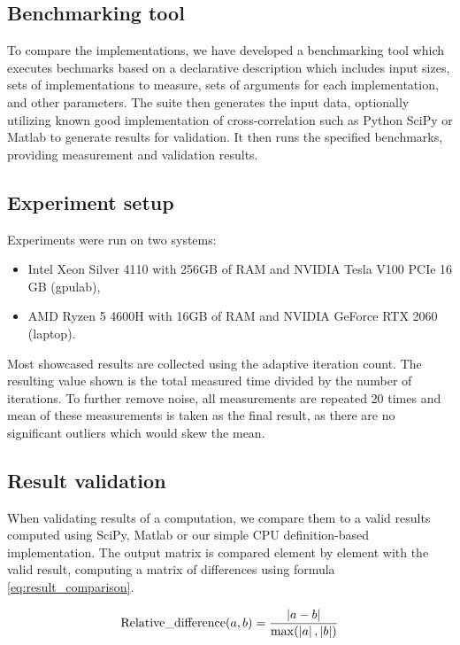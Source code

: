\subsection{Benchmarking tool}

To compare the implementations, we have developed a benchmarking tool which executes bechmarks based on a declarative description which includes input sizes, sets of implementations to measure, sets of arguments for each implementation, and other parameters. The suite then generates the input data, optionally utilizing known good implementation of cross-correlation such as Python SciPy or Matlab to generate results for validation. It then runs the specified benchmarks, providing measurement and validation results.

\subsection{Experiment setup}

Experiments were run on two systems:
\begin{itemize}
	\item Intel Xeon Silver 4110 with 256GB of RAM and NVIDIA Tesla V100 PCIe 16 GB (gpulab),
	\item AMD Ryzen 5 4600H with 16GB of RAM and NVIDIA GeForce RTX 2060 (laptop).
\end{itemize}

Most showcased results are collected using the adaptive iteration count. The resulting value shown is the total measured time divided by the number of iterations. To further remove noise, all measurements are repeated 20 times and mean of these measurements is taken as the final result, as there are no significant outliers which would skew the mean.

\subsection{Result validation}


When validating results of a computation, we compare them to a valid results computed using SciPy, Matlab or our simple CPU definition-based implementation. The output matrix is compared element by element with the valid result, computing a matrix of differences using formula \ref{eq:result_comparison}.

\begin{equation}
\label{eq:result_comparison}
\mathrm{Relative\_difference }(a, b) = \frac{\left|{a - b}\right|}{\max(\left|{a}\right|, \left|{b}\right|)}
\end{equation}

